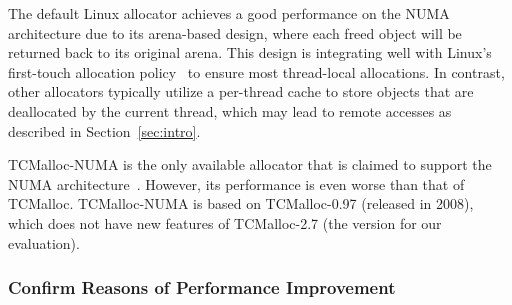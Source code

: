 
The default Linux allocator achieves a good performance on the NUMA architecture due to its arena-based design, where each freed object will be returned back to its original arena.
This design is integrating well with Linux's first-touch allocation policy~\citep{Lameter:2013:NO:2508834.2513149} to ensure most thread-local allocations. 
In contrast, other allocators typically utilize a per-thread cache to store objects that are deallocated by the current thread, which may lead to remote accesses as described in Section~\ref{sec:intro}. 

 TCMalloc-NUMA is the only available allocator that is claimed to support the NUMA architecture~\citep{tcmallocnew}. However, its performance is even worse than that of TCMalloc. TCMalloc-NUMA is based on TCMalloc-0.97 (released in 2008), which does not have new features of TCMalloc-2.7 (the version for our evaluation). 
 
 
  
  \subsubsection{Confirm Reasons of Performance Improvement}
  



